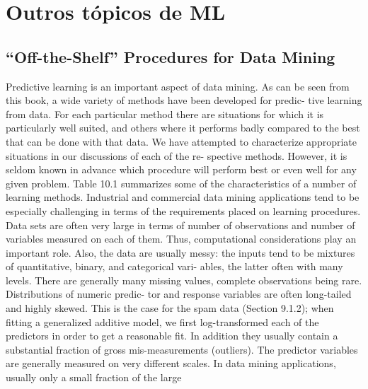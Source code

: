 
\chapter{Outros tópicos de ML} %

\label{ChapterX} %


\section{“Off-the-Shelf” Procedures for Data Mining}
Predictive learning is an important aspect of data mining. As can be seen
from this book, a wide variety of methods have been developed for predic-
tive learning from data. For each particular method there are situations
for which it is particularly well suited, and others where it performs badly
compared to the best that can be done with that data. We have attempted
to characterize appropriate situations in our discussions of each of the re-
spective methods. However, it is seldom known in advance which procedure
will perform best or even well for any given problem. Table 10.1 summarizes
some of the characteristics of a number of learning methods.
Industrial and commercial data mining applications tend to be especially
challenging in terms of the requirements placed on learning procedures.
Data sets are often very large in terms of number of observations and
number of variables measured on each of them. Thus, computational considerations play an important role. Also, the data are usually messy: the
inputs tend to be mixtures of quantitative, binary, and categorical vari-
ables, the latter often with many levels. There are generally many missing
values, complete observations being rare. Distributions of numeric predic-
tor and response variables are often long-tailed and highly skewed. This
is the case for the spam data (Section 9.1.2); when fitting a generalized
additive model, we first log-transformed each of the predictors in order to
get a reasonable fit. In addition they usually contain a substantial fraction
of gross mis-measurements (outliers). The predictor variables are generally
measured on very different scales.
In data mining applications, usually only a small fraction of the large
